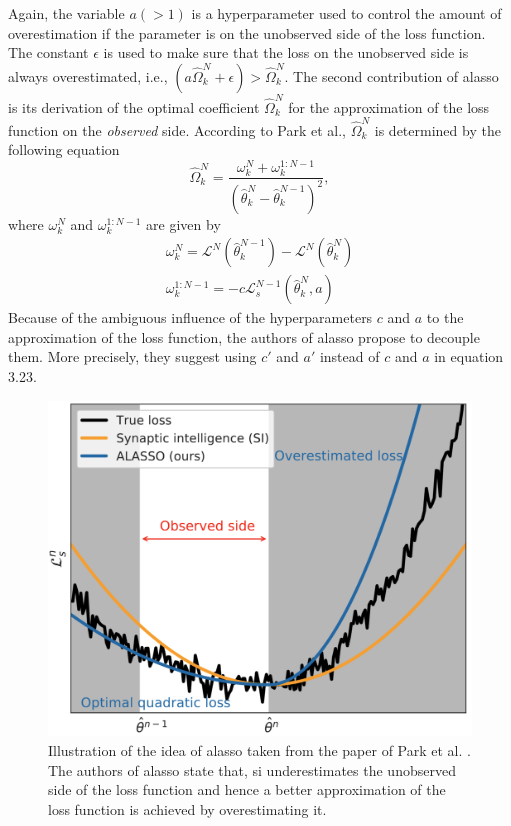 Again, the variable $a (>1)$ is a hyperparameter used to control the amount of overestimation if the parameter is on the unobserved side of the loss function.
The constant $\epsilon$ is used to make sure that the loss on the unobserved side is always overestimated, i.e., $(a \hat{\Omega}^N_k + \epsilon) > \hat{\Omega}^N_k$.
The second contribution of \gls{alasso} is its derivation of the optimal coefficient $\hat{\Omega}^N_k$ for the approximation of the loss function on the \textit{observed}
side. According to Park et al., $\hat{\Omega}^N_k$ is determined by the following equation
\begin{equation} \label{eq:ALASSO_Omega}
    \hat{\Omega}^N_k = \frac{\omega^N_k + \omega^{1:N-1}_k}{(\hat{\theta}^N_k - \hat{\theta}^{N-1}_k)^2},
\end{equation}
where $\omega^N_k$ and $\omega^{1:N-1}_k$ are given by
\begin{gather} \label{eq:ALASSO_Small_Omega}
    \omega^N_k = \mathcal{L}^N(\hat{\theta}^{N-1}_k) - \mathcal{L}^N(\hat{\theta}^N_k) \\
    \omega^{1:N-1}_k = -c\mathcal{L}^{N-1}_s(\hat{\theta}^N_k,a)
\end{gather}
Because of the ambiguous influence of the hyperparameters $c$ and $a$ to the approximation of the loss function, the authors of \gls{alasso} propose to decouple them. More
precisely, they suggest using $c'$ and $a'$ instead of $c$ and $a$ in equation 3.23.

\begin{figure} [ht]
    \centering
    \includegraphics[width=.5\linewidth]{images/Alasso_Idea.png}
    \caption[Visualization of \gls{alasso}]{Illustration of the idea of \gls{alasso} taken from the paper of Park et al. \cite{park2019continual}. The authors of \gls{alasso}
     state that, \gls{si}
    underestimates the unobserved side of the loss function and hence a better approximation of the loss function is achieved by overestimating it.}
    \label{fig:Alasso}
\end{figure}

